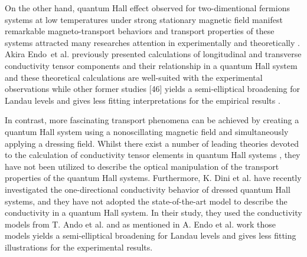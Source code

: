 On the other hand, quantum Hall effect \cite{girvin90} observed for two-dimentional fermions systems at low temperatures under strong stationary magnetic field manifest remarkable magneto-transport behaviors and transport properties of these systems attracted many researches attention in experimentally \cite{allerman95,tieke97,pan05} and theoretically \cite{ando72,ando74_1,ando74_2,ando74_3,ando74_4,ando82,endo09}.
Akira Endo et al. \cite{endo09} previously presented calculations of longitudinal and transverse conductivity tensor components and their relationship in a quantum Hall system and these theoretical calculations are well-suited with the experimental observations while other former studies [46] yields a semi-elliptical broadening for Landau levels and gives less fitting interpretations for the empirical results \cite{endo09}.

In contrast, more fascinating transport phenomena can be achieved by creating a quantum Hall system using a nonoscillating magnetic field and simultaneously applying a dressing field.
Whilst there exist a number of leading theories devoted to the calculation of conductivity tensor elements in quantum Hall systems \cite{ando74_1,ando82,endo09}, they have not been utilized to describe the optical manipulation of the transport properties of the quantum Hall systems.
Furthermore, K. Dini et al. \cite{dini16} have recently investigated the one-directional conductivity behavior of dressed quantum Hall systems, and they have not adopted the state-of-the-art model to describe the conductivity in a quantum Hall system. In their study, they used the conductivity models from T. Ando et al. \cite{ando74_1,ando82} and as mentioned in A. Endo et al. work \cite{endo09} those models yields a semi-elliptical broadening for Landau levels and gives less fitting illustrations for the experimental results.

